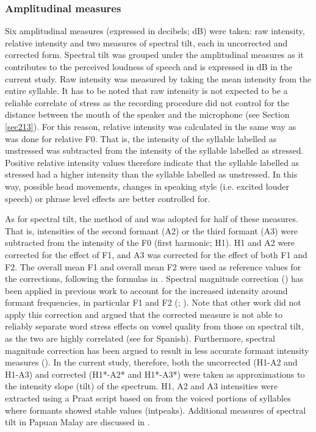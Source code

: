 \subsubsection{Amplitudinal measures}
Six amplitudinal measures (expressed in decibels; dB) were taken: raw intensity, relative intensity and two measures of spectral tilt, each in uncorrected and corrected form. Spectral tilt was grouped under the amplitudinal measures as it contributes to the perceived loudness of speech and is expressed in dB in the current study. Raw intensity was measured by taking the mean intensity from the entire syllable. It has to be noted that raw intensity is not expected to be a reliable correlate of stress as the recording procedure did not control for the distance between the mouth of the speaker and the microphone (see Section \ref{sec213}). For this reason, relative intensity was calculated in the same way as was done for relative F0. That is, the intensity of the syllable labelled as unstressed was subtracted from the intensity of the syllable labelled as stressed. Positive relative intensity values therefore indicate that the syllable labelled as stressed had a higher intensity than the syllable labelled as unstressed. In this way, possible head movements, changes in speaking style (i.e. excited louder speech) or phrase level effects are better controlled for.\par

As for spectral tilt, the method of \citet{sluijter_supralaryngeal_1995} and \citet{stevens_classification_1995} was adopted for half of these measures. That is, intensities of the second formant (A2) or the third formant (A3) were subtracted from the intensity of the F0 (first harmonic; H1). H1 and A2 were corrected for the effect of F1, and A3 was corrected for the effect of both F1 and F2. The overall mean F1 and overall mean F2 were used as reference values for the corrections, following the formulas in \citet[113-115]{hanson_glottal_1997}. Spectral magnitude correction (\citealt{iseli_age_2007}) has been applied in previous work to account for the increased intensity around formant frequencies, in particular F1 and F2 (\citealt{sluijter_supralaryngeal_1995}; \citealt{stevens_classification_1995}). Note that other work did not apply this correction and argued that the corrected measure is not able to reliably separate word stress effects on vowel quality from those on spectral tilt, as the two are highly correlated (see \citealt{ortega-llebaria_acoustic_2011} for Spanish). Furthermore, spectral magnitude correction has been argued to result in less accurate formant intensity measures (\citealt{caballero_tone_2015}). In the current study, therefore, both the uncorrected (H1-A2 and H1-A3) and corrected (H1*-A2* and H1*-A3*) were taken as approximations to the intensity slope (tilt) of the spectrum. H1, A2 and A3 intensities were extracted using a Praat script based on \citet{mayer_spektrales_2014} from the voiced portions of syllables where formants showed stable values (intpeaks). Additional measures of spectral tilt in Papuan Malay are discussed in \citet{kaland_spectral_2018}.


